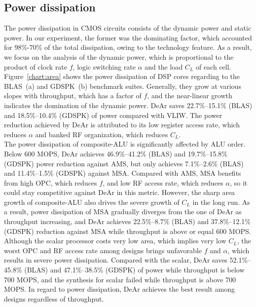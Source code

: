 {    \subsection{Power dissipation}
    The power dissipation in CMOS circuits consists of the dynamic power and static power.
    In our experiment, the former was the dominating factor, which accounted for 98\%-70\% of the total dissipation, 
    owing to the technology feature.
    As a result, we focus on the analysis of the dynamic power, 
    which is proportional to the product of clock rate $f$, logic switching rate $\alpha$ and the load $C_L$ of each cell.
    \\\indent
    Figure~\ref{chart:area} shows the power dissipation of DSP cores regarding to the BLAS~(a) and GDSPK~(b) benchmark suites.
    Generally, they grow at various slopes with throughput, which has a factor of $f$, 
    and the near-linear growth indicates the domination of the dynamic power.
    DeAr saves 22.7\%--15.1\% (BLAS) and 18.5\%--10.4\% (GDSPK) of power compared with VLIW.
    The power reduction achieved by DeAr is attributed to its low register access rate, which reduces $\alpha$
    and banked RF organization, which reduces $C_L$.
    \\\indent
    The power dissipation of composite-ALU is significantly affected by ALU order.
    Below 600 MOPS, DeAr achieves 46.9\%--41.2\% (BLAS) and 19.7\%--15.8\% (GDSPK) power reduction against AMS, 
    but only achieves 7.1\%--2.6\% (BLAS) and 11.4\%--1.5\% (GDSPK) against MSA.  
    Compared with AMS, MSA benefits from high OPC, which reduces $f$, and low RF access rate, which reduces $\alpha$, 
    so it could stay competitive against DeAr in this metric.
    However, the sharp area growth of composite-ALU also drives the severe growth of $C_L$ in the long run.
    As a result, power dissipation of MSA gradually diverges from the one of DeAr as throughput increasing, 
    and DeAr achieves 22.5\%--8.7\% (BLAS) and 37.8\%--12.1\% (GDSPK) reduction against MSA while throughput is above or equal 600 MOPS.
    \\\indent
    Although the scalar processor costs very low area, which implies very low $C_L$, 
    the worst OPC and RF access rate among designs brings unfavorable $f$ and $\alpha$, 
    which results in severe power dissipation. 
    Compared with the scalar, DeAr saves 52.1\%--45.8\% (BLAS) and 47.1\%--38.5\% (GDSPK) of power while throughput is below 700 MOPS, 
    and the synthesis for scalar failed while throughput is above 700 MOPS.
    In regard to power dissipation, DeAr achieves the best result among designs regardless of throughput.
}
